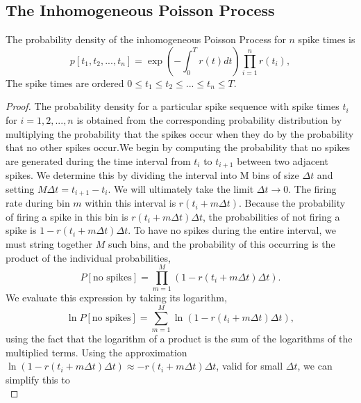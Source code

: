 \subsection{The Inhomogeneous Poisson Process}
\begin{thm}

The probability density of the inhomogeneous Poisson Process for $n$ spike times is 
    \begin{equation}
    p[t_1, t_2, ..., t_n]=\exp\left(-\int^T_0r(t)dt\right)\prod^n_{i=1}r(t_i),
        \label{equ:1.37}
    \end{equation}
    The spike times are ordered $0\leq t_1 \leq t_2\leq ... \leq t_n \leq T.$
    \begin{proof}
    The probability density for a particular spike sequence with spike times $t_i$ for $i = 1, 2, ..., n$ is obtained from the corresponding probability distribution by multiplying the probability that the spikes occur when they do by the probability that no other spikes occur.We begin by computing the probability that no spikes are generated during the time interval from $t_i$ to $t_{i+1}$ between two adjacent spikes. We determine this by dividing the interval into M bins of size $\Delta t$ and setting $M\Delta t=t_{i+1}-t_i$. We will ultimately take the limit $\Delta t\to 0$. The firing rate during bin $m$ within this interval is $r(t_i+m\Delta t)$. Because the probability of firing a spike in this bin is $r(t_i+m\Delta t)\Delta t$, the probabilities of not firing a spike is $1-r(t_i+m\Delta t)\Delta t$. To have no spikes during the entire interval, we must string together $M$ such bins,  and the probability of this occurring is the product of the individual probabilities, 
            \begin{equation}
            P[\text{no spikes}]=\prod_{m=1}^M(1-r(t_i+m\Delta t)\Delta t).
            \label{equ:1.52}
            \end{equation}
    We evaluate this expression by taking its logarithm,             
            \begin{equation}
            \ln P[\text{no spikes}]=\sum_{m=1}^M\ln(1-r(t_i+m\Delta t)\Delta t),
            \label{equ:1.53}
            \end{equation}
    using the fact that the logarithm of a product is the sum of the logarithms of the multiplied terms. Using the approximation $\ln (1-r(t_i+m\Delta t)\Delta t)\approx -r(t_i+m\Delta t)\Delta t$,  valid for small $\Delta t$, we can simplify this to 
            \begin{equation}

\end{equation}
\end{proof}
\end{thm}
